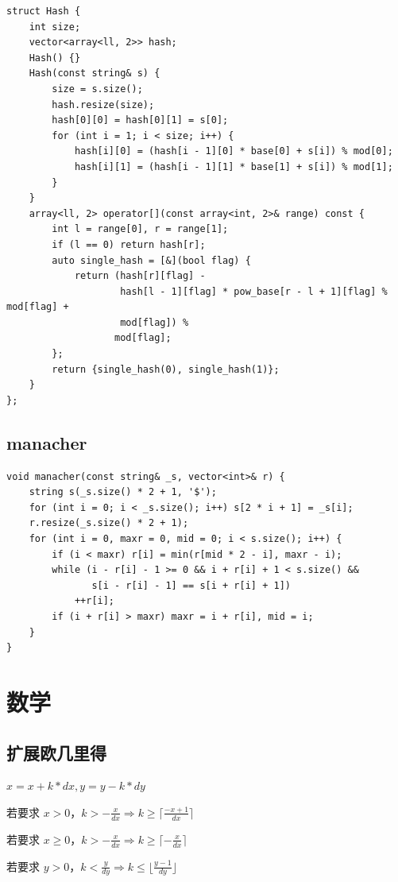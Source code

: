\documentclass[UTF8]{ctexart}
\begin{document}
\begin{sloppypar}
\begin{lstlisting}[style=cpp]
struct Hash {
    int size;
    vector<array<ll, 2>> hash;
    Hash() {}
    Hash(const string& s) {
        size = s.size();
        hash.resize(size);
        hash[0][0] = hash[0][1] = s[0];
        for (int i = 1; i < size; i++) {
            hash[i][0] = (hash[i - 1][0] * base[0] + s[i]) % mod[0];
            hash[i][1] = (hash[i - 1][1] * base[1] + s[i]) % mod[1];
        }
    }
    array<ll, 2> operator[](const array<int, 2>& range) const {
        int l = range[0], r = range[1];
        if (l == 0) return hash[r];
        auto single_hash = [&](bool flag) {
            return (hash[r][flag] -
                    hash[l - 1][flag] * pow_base[r - l + 1][flag] % mod[flag] +
                    mod[flag]) %
                   mod[flag];
        };
        return {single_hash(0), single_hash(1)};
    }
};
\end{lstlisting}

\subsection{manacher}

\begin{lstlisting}[style=cpp]
void manacher(const string& _s, vector<int>& r) {
    string s(_s.size() * 2 + 1, '$');
    for (int i = 0; i < _s.size(); i++) s[2 * i + 1] = _s[i];
    r.resize(_s.size() * 2 + 1);
    for (int i = 0, maxr = 0, mid = 0; i < s.size(); i++) {
        if (i < maxr) r[i] = min(r[mid * 2 - i], maxr - i);
        while (i - r[i] - 1 >= 0 && i + r[i] + 1 < s.size() &&
               s[i - r[i] - 1] == s[i + r[i] + 1])
            ++r[i];
        if (i + r[i] > maxr) maxr = i + r[i], mid = i;
    }
}
\end{lstlisting}

\clearpage

\section{数学}

\subsection{扩展欧几里得}

$x=x+k*dx,y=y-k*dy$

若要求 $x>0$，$k>-\frac{x}{dx}\Rightarrow k\ge\lceil \frac{-x+1}{dx}\rceil$

若要求 $x\ge0$，$k>-\frac{x}{dx}\Rightarrow k\ge\lceil -\frac{x}{dx}\rceil$

若要求 $y>0$，$k<\frac{y}{dy}\Rightarrow k\le\lfloor \frac{y-1}{dy}\rfloor$


\end{sloppypar}
\end{document}
